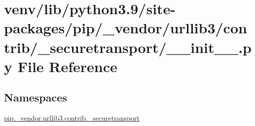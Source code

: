 \hypertarget{venv_2lib_2python3_89_2site-packages_2pip_2__vendor_2urllib3_2contrib_2__securetransport_2____init_____8py}{}\section{venv/lib/python3.9/site-\/packages/pip/\+\_\+vendor/urllib3/contrib/\+\_\+securetransport/\+\_\+\+\_\+init\+\_\+\+\_\+.py File Reference}
\label{venv_2lib_2python3_89_2site-packages_2pip_2__vendor_2urllib3_2contrib_2__securetransport_2____init_____8py}
\subsection*{Namespaces}
\begin{DoxyCompactItemize}
\item 
 \hyperlink{namespacepip_1_1__vendor_1_1urllib3_1_1contrib_1_1__securetransport}{pip.\+\_\+vendor.\+urllib3.\+contrib.\+\_\+securetransport}
\end{DoxyCompactItemize}
